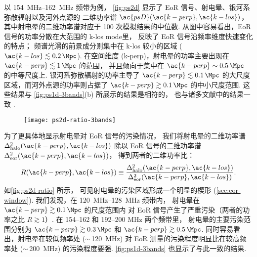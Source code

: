 以 \SIrange{154}{162}{\MHz} 频带为例，
\autoref{fig:ps2d} 显示了 EoR 信号、射电晕、银河系弥散辐射以及河外点源的
二维功率谱 $\ac{psD}(\ac{k-perp}, \ac{k-los})$，
其中射电晕的二维功率谱对应于 100 次模拟结果的中位数.
从图中容易看出，EoR 信号的功率分散在大范围的 \ac{k-los} \ac{mode}里，
反映了 EoR 信号沿频率维度快速变化的特点；
频谱光滑的前景成分则集中在 \ac{k-los} 较小的区域
($\ac{k-los} \lesssim \SI{0.2}{\per\Mpc}$).
在空间维度 (\ac{k-perp})，射电晕的功率主要出现在
$\ac{k-perp} \lesssim \SI{1}{\per\Mpc}$ 的范围，
并且倾向于集中在 $\ac{k-perp} \sim \SI{0.5}{\per\Mpc}$ 的中等尺度上.
银河系弥散辐射的功率主导了 $\ac{k-perp} \lesssim \SI{0.1}{\per\Mpc}$
的大尺度区域，而河外点源的功率则占据了 $\ac{k-perp} \gtrsim \SI{0.1}{\per\Mpc}$
的中小尺度范围.
这些结果与 \autoref{fig:ps1d-3bands}(b) 所展示的结果是相符的，
也与诸多文献中的结果一致 \cite{datta2010,trott2015,barry2016,chapman2016}.

\begin{figure}[htp]
  \centering
  \texttt{[image: ps2d-ratio-3bands]}
  \label{fig:ps2d-ratio}
\end{figure}

为了更具体地显示射电晕对 EoR 信号的污染情况，
我们将射电晕的二维功率谱 $\Delta^2_{\R{halo}}(\ac{k-perp}, \ac{k-los})$
除以 EoR 信号的二维功率谱 $\Delta^2_{\R{eor}}(\ac{k-perp}, \ac{k-los})$，
得到两者的二维功率比：
\begin{equation}
  R(\ac{k-perp}, \ac{k-los})
    \equiv \frac{\Delta^2_{\R{halo}}(\ac{k-perp}, \ac{k-los})}{
      \Delta^2_{\R{eor}}(\ac{k-perp}, \ac{k-los})} .
\end{equation}
如\autoref{fig:ps2d-ratio} 所示，
可见射电晕的污染区域形成一个明显的楔形 (\autoref{sec:eor-window}).
我们发现，在 \SIrange{120}{128}{\MHz} 频带内，
射电晕在 $\ac{k-perp} \gtrsim \SI{0.1}{\per\Mpc}$ 的尺度范围内
对 EoR 信号产生了严重污染（两者的功率之比 $R \gtrsim 1$）.
在 \numrange{154}{162} 和 \numrange{192}{200} \si{\MHz} 两个频带里，
射电晕的主要污染范围分别为 $\ac{k-perp} \gtrsim \SI{0.3}{\per\Mpc}$
和 $\ac{k-perp} \gtrsim \SI{0.5}{\per\Mpc}$.
同时容易看出，射电晕在较低频率处 ($\sim$\,\SI{120}{\MHz})
对 EoR 测量的污染程度明显比在较高频率处 ($\sim$\,\SI{200}{\MHz})
的污染程度要强.
\autoref{fig:ps1d-3bands} 也显示了与此一致的结果.

